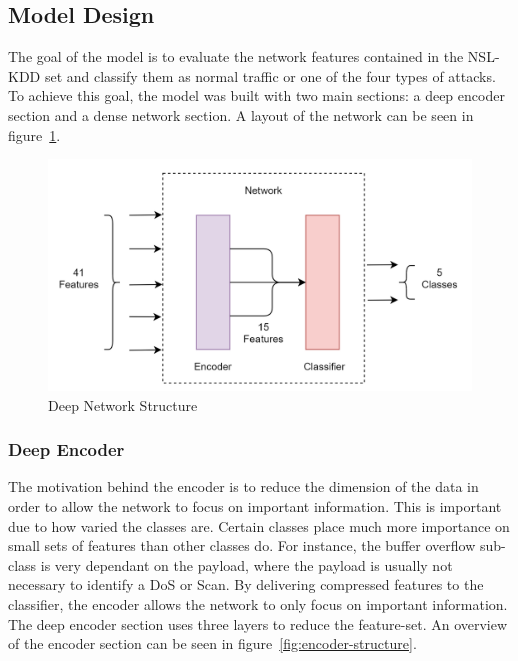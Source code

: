 \documentclass{article}
\begin{document}
\subsection{Model Design}

The goal of the model is to evaluate the network features contained in the NSL-KDD set and classify them as normal traffic or one of the four types of attacks. To achieve this goal, the model was built with two main sections: a deep encoder section and a dense network section. A layout of the network can be seen in figure~\ref{fig:network-structure}.

\begin{figure}[!htb]
  \centering
  \includegraphics[totalheight=7cm]{figures/network-structure.png}
  \caption{Deep Network Structure}
  \label{fig:network-structure}
  \centering
\end{figure}

\subsubsection{Deep Encoder}

The motivation behind the encoder is to reduce the dimension of the data in order to allow the network to focus on important information. This is important due to how varied the classes are. Certain classes place much more importance on small sets of features than other classes do. For instance, the buffer overflow sub-class is very dependant on the payload, where the payload is usually not necessary to identify a DoS or Scan. By delivering compressed features to the classifier, the encoder allows the network to only focus on important information. The deep encoder section uses three layers to reduce the feature-set. An overview of the encoder section can be seen in figure~\ref{fig:encoder-structure}.
\end{document}
